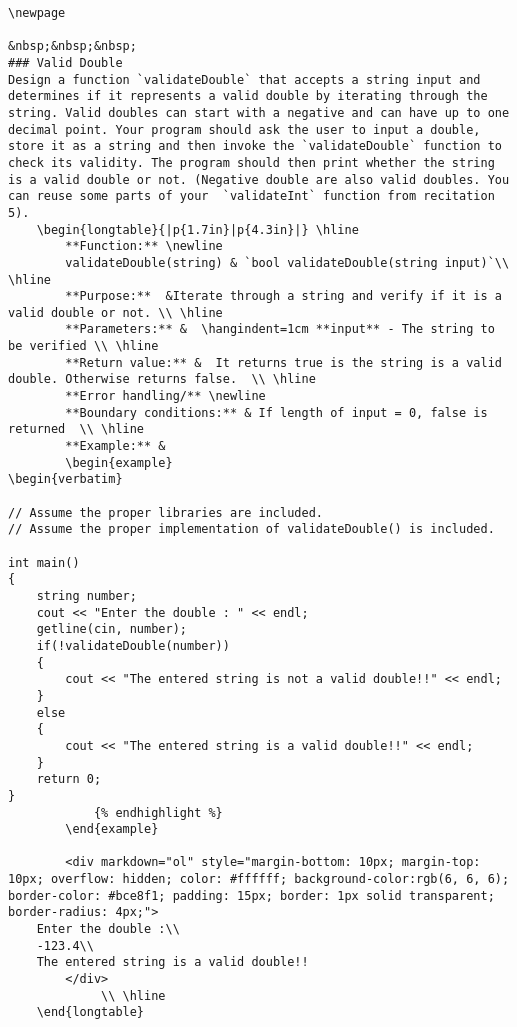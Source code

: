 {{{{{{{{{{\begin{problem}
\begin{verbatim}
\newpage 

&nbsp;&nbsp;&nbsp;
### Valid Double
Design a function `validateDouble` that accepts a string input and determines if it represents a valid double by iterating through the string. Valid doubles can start with a negative and can have up to one decimal point. Your program should ask the user to input a double, store it as a string and then invoke the `validateDouble` function to check its validity. The program should then print whether the string is a valid double or not. (Negative double are also valid doubles. You can reuse some parts of your  `validateInt` function from recitation 5).
    \begin{longtable}{|p{1.7in}|p{4.3in}|} \hline
        **Function:** \newline 
        validateDouble(string) & `bool validateDouble(string input)`\\ \hline
        **Purpose:**  &Iterate through a string and verify if it is a valid double or not. \\ \hline
        **Parameters:** &  \hangindent=1cm **input** - The string to be verified \\ \hline
        **Return value:** &  It returns true is the string is a valid double. Otherwise returns false.  \\ \hline
        **Error handling/** \newline
        **Boundary conditions:** & If length of input = 0, false is returned  \\ \hline
        **Example:** & 
        \begin{example}
\begin{verbatim}

// Assume the proper libraries are included.
// Assume the proper implementation of validateDouble() is included.

int main()
{
    string number;
    cout << "Enter the double : " << endl;
    getline(cin, number);
    if(!validateDouble(number))
    {
        cout << "The entered string is not a valid double!!" << endl;
    }
    else
    {
        cout << "The entered string is a valid double!!" << endl;
    }
    return 0;
}
            {% endhighlight %}
        \end{example}

        <div markdown="ol" style="margin-bottom: 10px; margin-top: 10px; overflow: hidden; color: #ffffff; background-color:rgb(6, 6, 6); border-color: #bce8f1; padding: 15px; border: 1px solid transparent; border-radius: 4px;">
    Enter the double :\\
    -123.4\\
    The entered string is a valid double!!
        </div>
             \\ \hline
    \end{longtable}


\end{verbatim}
\end{problem}}}}}}}}}}}
